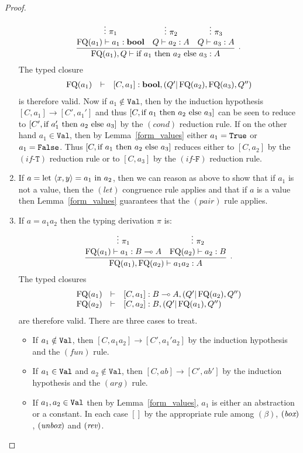 \documentclass[twoside]{article}
\begin{document}
\begin{proof}
\begin{enumerate}
  \[
  \infer[.]{\FQ(a_1),Q\entails \ifthenelse{a_1}{a_2}{a_3}:A}{
    \deduce[]{\FQ(a_1)\entails a_1:\bool }{
      \vdots~\pi_1
    }
    &
    \deduce[]{Q \entails a_2:A}{
      \vdots~\pi_2
    }    
    &
    \deduce[]{Q \entails a_3:A}{
      \vdots~\pi_3
    }    
  }
  \]  
  The typed closure
  \[
  \begin{array}{rcl}
  \mathop{\textrm{FQ}}\nolimits(a_1) & \vdash & [C,a_1]:\textrm{\bf bool},(Q'|\mathop{\textrm{FQ}}\nolimits(a_2),\mathop{\textrm{FQ}}\nolimits(a_3),Q'')
  \end{array}
  \]
  is therefore valid. Now if $a_1\notin\mathtt{Val}$, then by the induction hypothesis 
  $[C,a_1]\to[C',a_1']$ and thus $[C,\text{if}~ a_1 ~\text{then}~ a_2 ~\text{else}~ a_3]$ can
  be seen to reduce
  to $[C',\text{if}~ a_1' ~\text{then}~ a_2 ~\text{else}~ a_3]$ by the $(cond)$ reduction rule. 
  If on the other hand $a_1\in\mathtt{Val}$, then by 
  Lemma~\hyperref[form_values]{\ref*{form_values}} either $a_1=\texttt{True}$ or $a_1=\texttt{False}$. 
  Thus $[C,\text{if}~ a_1 ~\text{then}~ a_2 ~\text{else}~ a_3]$ reduces either to $[C,a_2]$ by the 
  $(if\mbox{-}\mathtt{T})$ reduction rule or 
  to $[C,a_3]$ by the $(if\mbox{-}\mathtt{F})$ reduction rule.
  \item If $a=\text{let}~ \langle x,y\rangle = a_1 ~\text{in}~ a_2$, then we can reason as above to show that 
  if $a_1$ is not a value, then the $(let)$ congruence rule applies and that if 
  $a$ is a value then Lemma~\hyperref[form_values]{\ref*{form_values}} 
  guarantees that the $(pair)$ rule applies.
  \item If $a=a_1a_2$ then the typing derivation $\pi$ is: 
  \[
    \infer[.]{\FQ(a_1),\FQ(a_2)\entails a_1a_2:A}{
      \deduce[]{\FQ(a_1)\entails a_1:B\loli A}{
        \vdots~\pi_1
      }
      &
      \deduce[]{\FQ(a_2)\entails a_2:B}{
        \vdots~\pi_2
      }      
    }
  \]  
  The typed closures
  \[
  \begin{array}{rcl}
  \mathop{\textrm{FQ}}\nolimits(a_1) & \vdash & [C,a_1]:B\multimap A,(Q'|\mathop{\textrm{FQ}}\nolimits(a_2),Q'')\\
  \mathop{\textrm{FQ}}\nolimits(a_2) & \vdash & [C,a_2]:B, (Q'|\mathop{\textrm{FQ}}\nolimits(a_1),Q'')
  \end{array}
  \]
  are therefore valid. There are three cases to treat.
  \begin{itemize}
    \item If $a_1\notin\texttt{Val}$, then $[C,a_1a_2]\to[C',a_1'a_2]$
    by the induction hypothesis and the $(fun)$ rule.
    \item If $a_1\in\texttt{Val}$ and $a_2\notin\mathtt{Val}$, then 
    $[C,ab]\to[C',ab']$ by the induction hypothesis and the $(arg)$ 
    rule.
    \item If $a_1,a_2\in\texttt{Val}$ then by 
    Lemma~\hyperref[form_values]{\ref*{form_values}}, $a_1$ is either 
    an abstraction or a constant. In each case $[]$ by the appropriate 
    rule among $(\beta)$, $(\mathop{\textit{box}}\nolimits)$, $(\mathop{\textit{unbox}}\nolimits)$ and $(\mathop{\textit{rev}}\nolimits)$. 
  \end{itemize}
\end{enumerate}
\end{proof}
\end{document}
